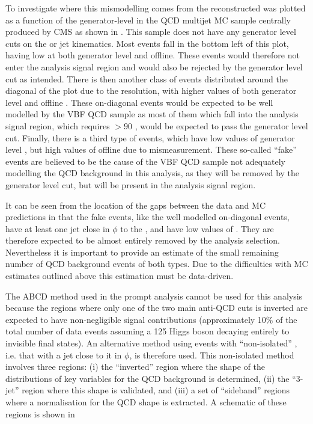 To investigate where this mismodelling comes from the reconstructed \MET was plotted as a function of the generator-level \MET in the \ac{QCD} multijet \ac{MC} sample centrally produced by CMS as shown in . This sample does not have any generator level cuts on the \MET or jet kinematics. Most events fall in the bottom left of this plot, having low \MET at both generator level and offline. These events would therefore not enter the analysis signal region and would also be rejected by the generator level cut as intended. There is then another class of events distributed around the diagonal of the plot due to the \MET resolution, with higher values of both generator level and offline \MET. These on-diagonal events would be expected to be well modelled by the \ac{VBF} \ac{QCD} sample as most of them which fall into the analysis signal region, which requires \MET$>90$ \GeV, would be expected to pass the generator level cut. Finally, there is a third type of events, which have low values of generator level \MET, but high values of offline \MET due to mismeasurement. These so-called ``fake'' \MET events are believed to be the cause of the \ac{VBF} \ac{QCD} sample not adequately modelling the \ac{QCD} background in this analysis, as they will be removed by the generator level cut, but will be present in the analysis signal region. 

It can be seen from the location of the gaps between the data and \ac{MC} predictions in  that the fake \MET events, like the well modelled on-diagonal events, have at least one jet close in $\phi$ to the \MET, and have low values of \METsig. They are therefore expected to be almost entirely removed by the analysis selection. Nevertheless it is important to provide an estimate of the small remaining number of \ac{QCD} background events of both types. Due to the difficulties with \ac{MC} estimates outlined above this estimation must be data-driven.

The ABCD method used in the prompt analysis cannot be used for this analysis because the regions where only one of the two main anti-\ac{QCD} cuts is inverted are expected to have non-negligible signal contributions (approximately 10\% of the total number of data events assuming a 125 \GeV Higgs boson decaying entirely to invisible final states). An alternative method using events with ``non-isolated'' \MET, i.e. that with a jet close to it in $\phi$, is therefore used. This non-isolated method involves three regions: (i) the ``inverted'' region where the shape of the distributions of key variables for the \ac{QCD} background is determined, (ii) the ``3-jet'' region where this shape is validated, and (iii) a set of ``sideband'' regions where a normalisation for the \ac{QCD} shape is extracted. A schematic of these regions is shown in 

